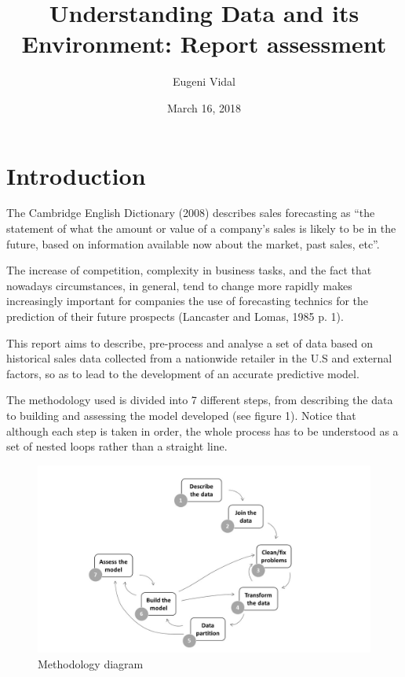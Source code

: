 \documentclass[11pt,]{article}
\title{Understanding Data and its Environment: Report assessment}
\author{Eugeni Vidal}
\date{March 16, 2018}
\begin{document}
\maketitle

{
\setcounter{tocdepth}{2}
\tableofcontents
}
\pagebreak

\section{Introduction}\label{introduction}

The Cambridge English Dictionary (2008) describes sales forecasting as
``the statement of what the amount or value of a company's sales is
likely to be in the future, based on information available now about the
market, past sales, etc''.

The increase of competition, complexity in business tasks, and the fact
that nowadays circumstances, in general, tend to change more rapidly
makes increasingly important for companies the use of forecasting
technics for the prediction of their future prospects (Lancaster and
Lomas, 1985 p. 1).

This report aims to describe, pre-process and analyse a set of data
based on historical sales data collected from a nationwide retailer in
the U.S and external factors, so as to lead to the development of an
accurate predictive model.

The methodology used is divided into 7 different steps, from describing
the data to building and assessing the model developed (see figure 1).
Notice that although each step is taken in order, the whole process has
to be understood as a set of nested loops rather than a straight line.

\begin{figure}[htbp]
\centering
\includegraphics{images/Methodology diagram.jpg}
\caption{Methodology diagram \label{}}
\end{figure}
\end{document}
